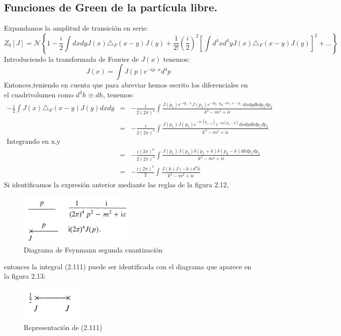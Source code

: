 \subsection{Funciones de Green de la partícula libre.}
Expandamos la amplitud de transición en serie:
\begin{equation}
Z_{0}[J]=\mathcal{N}\left\{ 1-\frac{i}{2}\int dxdyJ(x)\triangle_{F}(x-y)J(y)+\frac{1}{2!}\left(\frac{i}{2}\right)^{2}\left[\int d^{4}xd^{4}yJ(x)\triangle_{F}(x-y)J(y)\right]^{2}+...\right\}
\end{equation}
Introduciendo la transformada de Fourier de $J(x)$ tenemos:
\begin{equation}
J(x)=\int J(p)e^{-ip\cdot x}d^4p
\end{equation}
Entonces,teniendo en cuenta que para abreviar hemos escrito los diferenciales en el cuadrivolumen como $d^4h\equiv dh$, tenemos:
\begin{eqnarray}
\nonumber -\frac{i}{2}\int J(x)\triangle_F(x-y)J(y)dxdy&=&-\frac{i}{2(2\pi)^{4}}\int\frac{J(p_{1})e^{-ip_{1}\cdot x}J(p_{2})e^{-ip_{2}\cdot y}e^{-ik(x-y)}dxdydkdp_{1}dp_{2}}{k^{2}-m^{2}+i\epsilon}\\
\nonumber &=& -\frac{i}{2(2\pi)^{4}}\int\frac{J(p_{1})J(p_{2})e^{-ix(p_{1+k})}e^{-iy(p_{2}-k)}dxdydkdp_{1}dp_{2}}{k^{2}-m^{2}+i\epsilon}\\
\nonumber \text{Integrando en x,y} &&\\
\nonumber &=& -\frac{i(2\pi)^{8}}{2(2\pi)^{4}}\int\frac{J(p_{1})J(p_{2})\delta(p_{1}+k)\delta(p_{2}-k)dkdp_{1}dp_{2}}{k^{2}-m^{2}+i\epsilon}\\
&=& -\frac{i(2\pi)^{4}}{2}\int\frac{J(k)J(-k)d^{4}k}{k^{2}-m^{2}+i\epsilon}
\end{eqnarray}
Si identificamos la expresión anterior mediante las reglas de la figura 2.12,
\begin{figure}
\caption[Diagrama de Feynmann segunda cuantización]{Diagrama de Feynmann segunda cuantización}
\includegraphics[width=5.5cm]{Imagenes/Fig12}
\end{figure}
entonces la integral (2.111) puede ser identificada con el diagrama que aparece en la figura 2.13:
\begin{figure}
\caption[Diagrama de Feynmann segunda cuantización]{Representación de (2.111)}
\includegraphics[width=3cm]{Imagenes/Fig13}
\end{figure}
